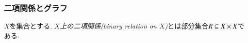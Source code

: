 
\subsubsection{二項関係とグラフ}

\begin{definition}\label{def:binary relation}

$X$を集合とする. \emph{$X$上の二項関係(binary relation on $X$)}とは部分集合$R\ss X\times X$である.

\end{definition}

